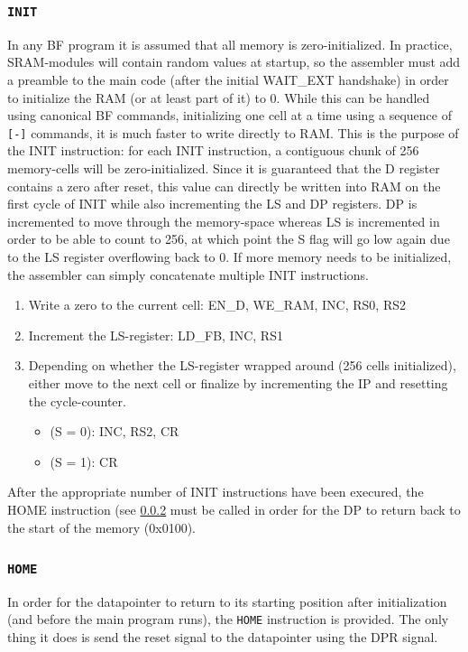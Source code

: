 \subsubsection{\texttt{INIT}} \label{sec:sequences:init}
In any BF program it is assumed that all memory is zero-initialized. In practice, SRAM-modules will contain random values at startup, so the assembler must add a preamble to the main code (after the initial WAIT\_EXT handshake) in order to initialize the RAM (or at least part of it) to 0. While this can be handled using canonical BF commands, initializing one cell at a time using a sequence of \texttt{[-]} commands, it is much faster to write directly to RAM. This is the purpose of the INIT instruction: for each INIT instruction, a contiguous chunk of 256 memory-cells will be zero-initialized. Since it is guaranteed that the D register contains a zero after reset, this value can directly be written into RAM on the first cycle of INIT while also incrementing the LS and DP registers. DP is incremented to move through the memory-space whereas LS is incremented in order to be able to count to 256, at which point the S flag will go low again due to the LS register overflowing back to 0. If more memory needs to be initialized, the assembler can simply concatenate multiple INIT instructions.
\begin{enumerate}
\item Write a zero to the current cell: EN\_D, WE\_RAM, INC, RS0, RS2
\item Increment the LS-register: LD\_FB, INC, RS1
\item Depending on whether the LS-register wrapped around (256 cells initialized), either move to the next cell or finalize by incrementing the IP and resetting the cycle-counter.
  \begin{itemize}
  \item (S = 0): INC, RS2, CR
  \item (S = 1): CR
  \end{itemize}
\end{enumerate}
After the appropriate number of INIT instructions have been execured, the HOME instruction (see \ref{sec:sequences:home} must be called in order for the DP to return back to the start of the memory (0x0100).

\subsubsection{\texttt{HOME}} \label{sec:sequences:home}
In order for the datapointer to return to its starting position after initialization (and before the main program runs), the \texttt{HOME} instruction is provided. The only thing it does is send the reset signal to the datapointer using the DPR signal.

